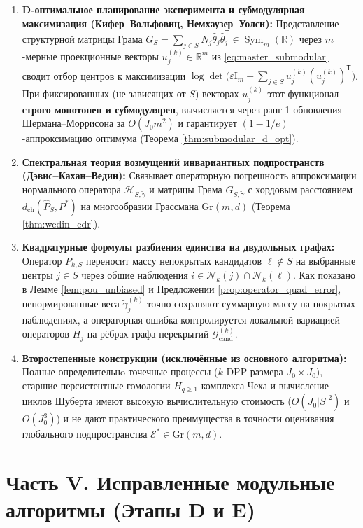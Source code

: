 \documentclass[11pt,a4paper]{article}
\newcommand{\R}{\mathbb{R}}
\newcommand{\Id}{\mathrm{I}}
\newcommand{\T}{^{\mathsf{T}}}
\newcommand{\Gr}{\mathrm{Gr}}
\newcommand{\PEDRs}{P^{*}}
\theoremstyle{definition}
\theoremstyle{remark}
\begin{document}
\begin{enumerate}
    \item \textbf{D-оптимальное планирование эксперимента и субмодулярная максимизация (Кифер--Вольфовиц, Немхаузер--Уолси):}
    Представление структурной матрицы Грама $G_S = \sum_{j \in S} N_j \hat{\theta}_j \hat{\theta}_j\T \in \operatorname{Sym}_m^+(\R)$ через $m$-мерные проекционные векторы $u_j^{(k)} \in \R^m$ из \eqref{eq:master_submodular} сводит отбор центров к максимизации $\log\det\bigl(\varepsilon \Id_m + \sum_{j \in S} u_j^{(k)}(u_j^{(k)})\T\bigr)$. При фиксированных (не зависящих от $S$) векторах $u_j^{(k)}$ этот функционал \textbf{строго монотонен и субмодулярен}, вычисляется через ранг-1 обновления Шермана--Моррисона за $O(J_0 m^2)$ и гарантирует $(1 - 1/e)$-аппроксимацию оптимума (Теорема \ref{thm:submodular_d_opt}).
    \item \textbf{Спектральная теория возмущений инвариантных подпространств (Дэвис--Кахан--Ведин):}
    Связывает операторную погрешность аппроксимации нормального оператора $\mathcal{H}_{S,\tilde{\gamma}}$ и матрицы Грама $G_{S,\tilde{\gamma}}$ с хордовым расстоянием $d_{\mathrm{ch}}(\hat{P}_S, \PEDRs)$ на многообразии Грассмана $\Gr(m,d)$ (Теорема \ref{thm:wedin_edr}).
    \item \textbf{Квадратурные формулы разбиения единства на двудольных графах:}
    Оператор $P_{k,S}$ переносит массу непокрытых кандидатов $\ell \notin S$ на выбранные центры $j \in S$ через общие наблюдения $i \in \mathcal{N}_k(j) \cap \mathcal{N}_k(\ell)$. Как показано в Лемме \ref{lem:pou_unbiased} и Предложении \ref{prop:operator_quad_error}, ненормированные веса $\tilde{\gamma}_j^{(k)}$ точно сохраняют суммарную массу на покрытых наблюдениях, а операторная ошибка контролируется локальной вариацией операторов $H_j$ на рёбрах графа перекрытий $\mathcal{G}_{\mathrm{cand}}^{(k)}$.
    \item \textbf{Второстепенные конструкции (исключённые из основного алгоритма):}
    Полные определительнo-точечные процессы ($k$-DPP размера $J_0 \times J_0$), старшие персистентные гомологии $H_{q \ge 1}$ комплекса Чеха и вычисление циклов Шуберта имеют высокую вычислительную стоимость ($O(J_0 |S|^2)$ и $O(J_0^3)$) и не дают практического преимущества в точности оценивания глобального подпространства $\mathcal{E}^* \in \Gr(m,d)$.
\end{enumerate}

\section{Часть V. Исправленные модульные алгоритмы (Этапы D и E)}
\label{sec:part5}
\end{document}
